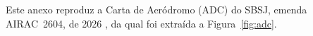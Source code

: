 Este anexo reproduz a Carta de Aeródromo (ADC) do SBSJ, emenda AIRAC~2604, de 2026 \cite{decea2026adc}, da qual foi extraída a Figura~\ref{fig:adc}.


